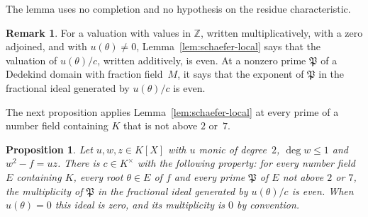 \documentclass[11pt]{amsart}
\newtheorem{proposition}[theorem]{Proposition}
\theoremstyle{definition}
\newtheorem{remark}[theorem]{Remark}
\numberwithin{equation}{section}
\newcommand{\Z}{\mathbb{Z}}
\newcommand{\lean}[1]{\ignorespaces}
\begin{document}
The lemma uses no completion and no hypothesis on the residue characteristic.

\begin{remark}\label{rem:schaefer-discrete}\lean{FurioLombardo.Discharge.SelmerBasis.schaefer_local, FurioLombardo.Discharge.SelmerBasis.schaefer_count}
For a valuation with values in $\Z$, written multiplicatively, with a zero adjoined, and with $u(\theta)\neq0$, Lemma~\ref{lem:schaefer-local} says that the valuation of $u(\theta)/c$, written additively, is even. At a nonzero prime $\mathfrak P$ of a Dedekind domain with fraction field~$M$, it says that the exponent of $\mathfrak P$ in the fractional ideal generated by $u(\theta)/c$ is even.
\end{remark}

The next proposition applies Lemma~\ref{lem:schaefer-local} at every prime of a number field containing $K$ that is not above $2$ or~$7$.

\begin{proposition}\label{prop:schaefer-global}\lean{FurioLombardo.Discharge.SelmerBasis.schaeferGlobal, FurioLombardo.Discharge.SelmerBasis.schaefer_global_of_certs, FurioLombardo.Discharge.SelmerBasis.schaefer_model_sq}
Let $u,w,z\in K[X]$ with $u$ monic of degree~$2$, $\deg w\le1$ and $w^2-f=uz$. There is $c\in K^\times$ with the following property: for every number field $E$ containing $K$, every root $\theta\in E$ of $f$ and every prime $\mathfrak P$ of $E$ not above $2$ or $7$, the multiplicity of $\mathfrak P$ in the fractional ideal generated by $u(\theta)/c$ is even. When $u(\theta)=0$ this ideal is zero, and its multiplicity is $0$ by convention.
\end{proposition}
\end{document}
